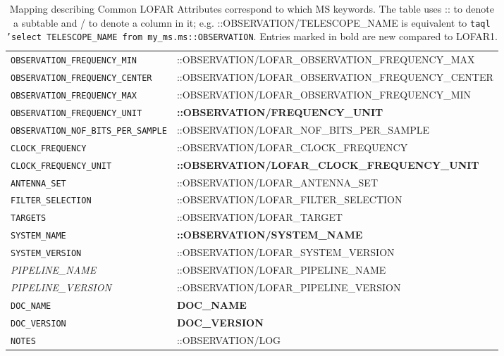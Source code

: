 \documentclass[a4paper,10pt,bibtotoc]{scrartcl}
\begin{document}
\begin{table}[H]
\begin{tabular}{|ll|}
    \small{\texttt{OBSERVATION\_FREQUENCY\_MIN}} & ::OBSERVATION/LOFAR\_OBSERVATION\_FREQUENCY\_MAX\\
    \small{\texttt{OBSERVATION\_FREQUENCY\_CENTER}} & ::OBSERVATION/LOFAR\_OBSERVATION\_FREQUENCY\_CENTER \\
    \small{\texttt{OBSERVATION\_FREQUENCY\_MAX}} &  ::OBSERVATION/LOFAR\_OBSERVATION\_FREQUENCY\_MIN\\
    \small\verb|OBSERVATION_FREQUENCY_UNIT| & \textbf{::OBSERVATION/FREQUENCY\_UNIT}\\
    \small\verb|OBSERVATION_NOF_BITS_PER_SAMPLE| & ::OBSERVATION/LOFAR\_NOF\_BITS\_PER\_SAMPLE\\
    \small\verb|CLOCK_FREQUENCY| & ::OBSERVATION/LOFAR\_CLOCK\_FREQUENCY\\
    \small{\verb|CLOCK_FREQUENCY_UNIT|} & \textbf{::OBSERVATION/LOFAR\_CLOCK\_FREQUENCY\_UNIT}\\
    \small\verb|ANTENNA_SET| & ::OBSERVATION/LOFAR\_ANTENNA\_SET\\
    \small \verb|FILTER_SELECTION| & ::OBSERVATION/LOFAR\_FILTER\_SELECTION\\
    \small \verb|TARGETS| & ::OBSERVATION/LOFAR\_TARGET\\
    \small \verb|SYSTEM_NAME| & \textbf{::OBSERVATION/SYSTEM\_NAME}\\
    \small \verb|SYSTEM_VERSION| & ::OBSERVATION/LOFAR\_SYSTEM\_VERSION\\
    \small{\textit{PIPELINE\_NAME}}  & ::OBSERVATION/LOFAR\_PIPELINE\_NAME\\
    \small{\textit{PIPELINE\_VERSION}} & ::OBSERVATION/LOFAR\_PIPELINE\_VERSION\\
    \small \verb|DOC_NAME| & \textbf{DOC\_NAME}\\
    \small \verb|DOC_VERSION| & \textbf{DOC\_VERSION}\\
    \small \verb|NOTES| & ::OBSERVATION/LOG\\
   \hline
  \end{tabular}
  \caption{Mapping describing Common LOFAR Attributes correspond to which MS keywords. The table uses :: to denote a subtable and / to denote a column in it; e.g. ::OBSERVATION/TELESCOPE\_NAME is equivalent to \texttt{taql 'select TELESCOPE\_NAME from my\_ms.ms::OBSERVATION}. Entries marked in bold are new compared to LOFAR1.}
  \label{tab:mapping_cla_ms}
\end{table}
\end{document}
